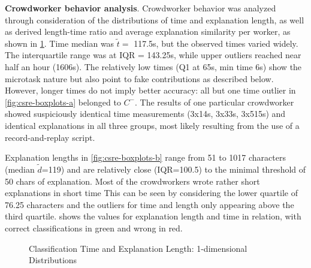 \textbf{Crowdworker behavior analysis}. Crowdworker behavior was analyzed through consideration of the distributions of time and explanation length, as well as derived length-time ratio and average explanation similarity per worker, as shown in \cref{fig:csre-boxplots}.
Time median was \(\tilde t=\) 117.5s, but the observed times varied widely.
The interquartile range was at IQR = 143.25s, while upper outliers reached near half an hour (1606s).
The relatively low times (Q1 at 65s, min time 6s) show the microtask nature but also point to fake contributions as described below.
However, longer times do not imply better accuracy: all but one time outlier in \cref{fig:csre-boxplots-a} belonged to \(C^-\).
The results of one particular crowdworker showed suspiciously identical time measurements (3x14s, 3x33s, 3x515s) and identical explanations in all three groups, most likely resulting from the use of a record-and-replay script.

Explanation lengths in \cref{fig:csre-boxplots-b} range from 51 to 1017 characters (median
\(\tilde{d}\)=119) and are relatively close (IQR=100.5) to the minimal threshold of 50 chars of explanation.
Most of the crowdworkers wrote rather short explanations in short time
This can be seen by considering the lower quartile of 76.25 characters and the outliers for time and length only appearing above the third quartile.
 shows the values for explanation length and time in relation, with correct classifications in green and wrong in red.

\begin{figure}[h]
\centering



\caption[Classification Time, Explanation Length: 1-dimensional Distributions]{Classification Time and Explanation Length: 1-dimensional Distributions \autocite{Heil2019CSRECCIS}}
\label{fig:csre-boxplots}
\end{figure}

